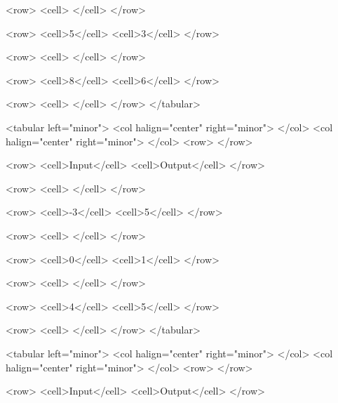                     <row>
                        <cell> </cell>
                    </row>

                    <row>
                        <cell>5</cell>
                        <cell>3</cell>
                    </row>

                    <row>
                        <cell> </cell>
                    </row>

                    <row>
                        <cell>8</cell>
                        <cell>6</cell>
                    </row>

                    <row>
                        <cell> </cell>
                    </row>
                </tabular>

                <tabular left="minor">
                    <col halign="center" right="minor"> </col> <col halign="center" right="minor"> </col>
                    <row>
                    </row>

                    <row>
                        <cell>Input</cell>
                        <cell>Output</cell>
                    </row>

                    <row>
                        <cell> </cell>
                    </row>

                    <row>
                        <cell>-3</cell>
                        <cell>5</cell>
                    </row>

                    <row>
                        <cell> </cell>
                    </row>

                    <row>
                        <cell>0</cell>
                        <cell>1</cell>
                    </row>

                    <row>
                        <cell> </cell>
                    </row>

                    <row>
                        <cell>4</cell>
                        <cell>5</cell>
                    </row>

                    <row>
                        <cell> </cell>
                    </row>
                </tabular>

                <tabular left="minor">
                    <col halign="center" right="minor"> </col> <col halign="center" right="minor"> </col>
                    <row>
                    </row>

                    <row>
                        <cell>Input</cell>
                        <cell>Output</cell>
                    </row>

